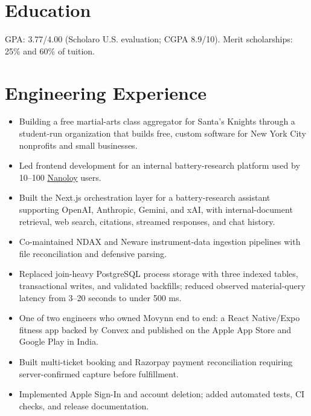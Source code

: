 

\resumeheader
\section{Education}
\vspace{3pt}
GPA: 3.77/4.00 (Scholaro U.S. evaluation; CGPA 8.9/10). Merit scholarships: 25\% and 60\% of tuition.
\section{Engineering Experience}
\begin{itemize}
  \item Building a free martial-arts class aggregator for Santa's Knights through a student-run organization that builds free, custom software for New York City nonprofits and small businesses.
\end{itemize}
\begin{itemize}
  \item Led frontend development for an internal battery-research platform used by 10--100 \href{https://www.nanoloy.com}{Nanoloy} users.
  \item Built the Next.js orchestration layer for a battery-research assistant supporting OpenAI, Anthropic, Gemini, and xAI, with internal-document retrieval, web search, citations, streamed responses, and chat history.
  \item Co-maintained NDAX and Neware instrument-data ingestion pipelines with file reconciliation and defensive parsing.
  \item Replaced join-heavy PostgreSQL process storage with three indexed tables, transactional writes, and validated backfills; reduced observed material-query latency from 3--20 seconds to under 500 ms.
\end{itemize}
\begin{itemize}
  \item One of two engineers who owned Movynn end to end: a React Native/Expo fitness app backed by Convex and published on the Apple App Store and Google Play in India.
  \item Built multi-ticket booking and Razorpay payment reconciliation requiring server-confirmed capture before fulfillment.
  \item Implemented Apple Sign-In and account deletion; added automated tests, CI checks, and release documentation.
\end{itemize}
